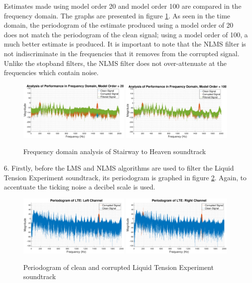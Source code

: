 \documentclass{article}
\begin{document}
Estimates made using model order 20 and model order 100 are compared in the frequency domain. The graphs are presented in figure \ref{fig:s2h_freq_domain}. As seen in the time domain, the periodogram of the estimate produced using a model order of 20 does not match the periodogram of the clean signal; using a model order of 100, a much better estimate is produced. It is important to note that the NLMS filter is not indiscriminate in the frequencies that it removes from the corrupted signal. Unlike the stopband filters, the NLMS filter does not over-attenuate at the frequencies which contain noise. 


\begin{figure}[H]
    \centering
    \includegraphics[width=0.49\textwidth]{s2h_freq_domain_order_20}
    \includegraphics[width=0.49\textwidth]{s2h_freq_domain_order_100}
    \caption{Frequency domain analysis of Stairway to Heaven soundtrack}
    \label{fig:s2h_freq_domain}
\end{figure}


6. Firstly, before the LMS and NLMS algorithms are used to filter the Liquid Tension Experiment soundtrack, its periodogram is graphed in figure \ref{fig:lte_periodogram}. Again, to accentuate the ticking noise a decibel scale is used.

\begin{figure}[H]
    \centering
    \includegraphics[width=0.49\textwidth]{lte_periodogram_left}
    \includegraphics[width=0.49\textwidth]{lte_periodogram_right}
    \caption{Periodogram of clean and corrupted Liquid Tension Experiment soundtrack}
    \label{fig:lte_periodogram}
\end{figure}
\end{document}
